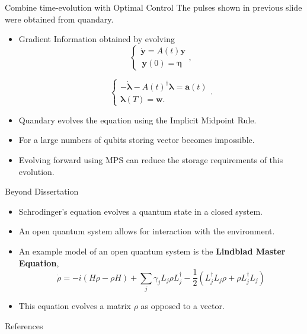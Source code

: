 \documentclass{beamer}
\begin{document}
\begin{frame}{Combine time-evolution with Optimal Control}
    The pulses shown in previous slide were obtained from quandary.

    \begin{itemize}[<+->]
        \item Gradient Information obtained by evolving$$\begin{cases}\dot{\boldsymbol{y}} = A(t)\boldsymbol{y}\\ \, \boldsymbol{y}(0) = \boldsymbol{\eta}\end{cases},$$
    
        $$\begin{cases}
        -\dot{\boldsymbol{\lambda}} - A(t)^{\dag}\boldsymbol{\lambda} = \boldsymbol{a}(t)\\
        \boldsymbol{\lambda}(T) = \boldsymbol{w}.
        \end{cases}.$$
        \item Quandary evolves the equation using the Implicit Midpoint Rule. 
        \item For a large numbers of qubits storing vector becomes impossible. 
        \item Evolving forward using MPS can reduce the storage requirements of this evolution.
        
    \end{itemize}
\end{frame}

\begin{frame}{Beyond Dissertation}
    \begin{itemize}[<+->]
    \item Schrodinger's equation evolves a quantum state in a closed system. 
    \item An open quantum system allows for interaction with the environment.
    \item An example model of an open quantum system is the \textbf{Lindblad Master Equation},
    \begin{equation*}
        \dot{\rho} = -i(H\rho - \rho H) + \sum_{j}\gamma_jL_j\rho L_j^{\dag} - \dfrac{1}{2}\left(L_j^{\dag}L_j\rho + \rho L_j^{\dag}L_j\right)
    \end{equation*}
    \item This equation evolves a matrix $\rho$ as opposed to a vector. 
    \end{itemize}
\end{frame}

\begin{frame}[allowframebreaks]{References}
    \printbibliography
\end{frame}
\end{document}
